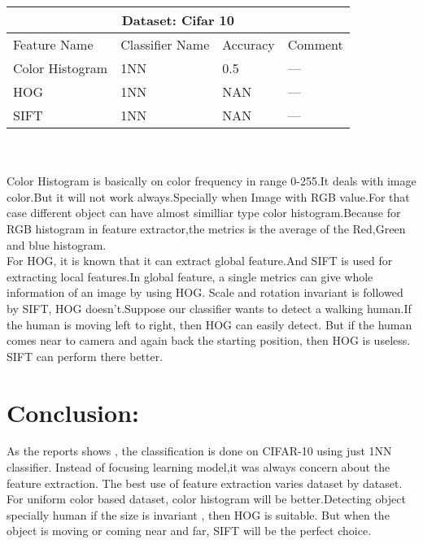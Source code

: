 \documentclass[12pt,a4paper] {article}
\begin{document}
	\begin{tabular}{ |p{3cm}||p{3cm}|p{3cm}|p{3cm}|  }
		\hline
		\multicolumn{4}{|c|}{ Dataset: Cifar 10 } \\
		\hline
		 	Feature Name & Classifier Name & Accuracy & Comment\\
		\hline
			Color Histogram & 1NN & 0.5 & --- \\
			HOG             & 1NN & NAN & --- \\
			SIFT            & 1NN & NAN & --- \\
		\hline
	\end{tabular}
	\\ \\
	Color Histogram is basically on color frequency in range 0-255.It deals with image color.But it will not work always.Specially when
	Image with RGB value.For that case different object can have almost similliar type color histogram.Because for RGB histogram in feature
	extractor,the metrics is the average of the Red,Green and blue histogram. \\

	For HOG, it is known that it can extract global feature.And SIFT is used for extracting local features.In global feature, a single 
	metrics can give whole information of an image by using HOG. Scale and rotation invariant is followed by SIFT, HOG doesn't.Suppose 
	our classifier wants to detect a walking human.If the human is moving left to right, then HOG can easily detect. But if the human
	comes near to camera and again back the starting position, then HOG is useless. SIFT can perform there better.


	\section{Conclusion:}
	As the reports shows , the classification is done on CIFAR-10 using just 1NN classifier. Instead of focusing learning model,it was
	always concern about the feature extraction. The best use of feature extraction varies dataset by dataset. For uniform color based 
	dataset, color histogram will be better.Detecting object specially human if the size is invariant , then HOG is suitable. But when
	the object is moving or coming near and far, SIFT will be the perfect choice. 
\end{document}
